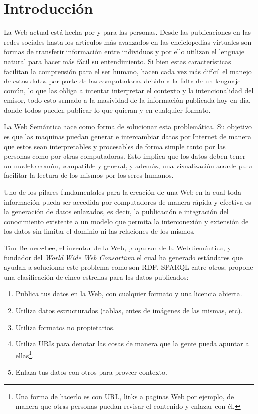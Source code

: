 
\chapter{Introducción}

La Web actual está hecha por y para las personas. Desde las publicaciones en las
redes sociales hasta los artículos más avanzados en las enciclopedias virtuales
son formas de transferir información entre individuos y por ello utilizan el
lenguaje natural para hacer más fácil su entendimiento. Si bien estas
características facilitan la comprensión para el ser humano, hacen cada
vez más difícil el manejo de estos datos por parte de las computadoras debido a
la falta de un lenguaje común, lo que las obliga a intentar interpretar el
contexto y la intencionalidad del emisor, todo esto sumado a la masividad de la
información publicada hoy en día, donde todos pueden publicar lo que quieran y
en cualquier formato.

La Web Semántica nace como forma de solucionar esta problemática.
Su objetivo es que las maquinas puedan generar e intercambiar datos por Internet 
de manera que estos sean interpretables y procesables de forma simple tanto por
las personas como por otras computadoras.
Esto implica que los datos deben tener un modelo común, compatible y general,
y además, una visualización acorde para facilitar la lectura de los mismos por
los seres humanos.

Uno de los pilares fundamentales para la creación de una Web en la cual toda
información pueda ser accedida por computadores de manera rápida y efectiva es
la generación de datos enlazados, es decir, la publicación e integración del 
conocimiento existente a un modelo que permita la interconexión y extensión de
los datos sin limitar el dominio ni las relaciones de los mismos.

Tim Berners-Lee, el inventor de la Web, propulsor de la Web Semántica,
y fundador del \emph{World Wide Web Consortium} el cual ha generado estándares
que ayudan a solucionar este problema como son RDF, SPARQL entre otros;
propone una clasificación de cinco estrellas para los datos publicados:
\begin{enumerate}
  \item
    Publica tus datos en la Web, con cualquier formato y una licencia abierta.
  \item
    Utiliza datos estructurados (tablas, antes de imágenes de las mismas, etc).
  \item
    Utiliza formatos no propietarios.
  \item
    Utiliza URIs para denotar las cosas de manera que la gente pueda apuntar a
    ellas\footnote{
    Una forma de hacerlo es con URL, links a paginas Web por ejemplo, de manera
    que otras personas puedan revisar el contenido y enlazar con él.}.
  \item
    Enlaza tus datos con otros para proveer contexto.
\end{enumerate}

